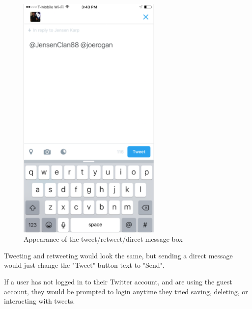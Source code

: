 \documentclass[11pt]{article}
\begin{document}
\begin{figure}[H]
    \centering
    \includegraphics[width=7cm]{retweetBox}
    \caption{Appearance of the tweet/retweet/direct message box}
    \label{fig:TweetInteractionBoxAppearance}
\end{figure}

Tweeting and retweeting would look the same, but sending a direct message would just change the "Tweet" button text to "Send".

If a user has not logged in to their Twitter account, and are using the guest account, they would be prompted to login anytime they tried saving, deleting, or interacting with tweets.


\end{document}
